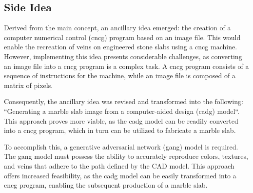 \subsection{Side Idea}
Derived from the main concept, an ancillary idea emerged: the creation of a computer numerical control (\gls{cncg}\glsfirstoccur) program based on an image file. 
This would enable the recreation of veins on engineered stone slabs using a \gls{cncg} machine. 
However, implementing this idea presents considerable challenges, as converting an image file into a \gls{cncg} program is a complex task. 
A \gls{cncg} program consists of a sequence of instructions for the machine, while an image file is composed of a matrix of pixels.

Consequently, the ancillary idea was revised and transformed into the following: ``Generating a marble slab image from a computer-aided design (\gls{cadg}\glsfirstoccur) model``.
This approach proves more viable, as the \gls{cadg} model can be readily converted into a \gls{cncg} program, which in turn can be utilized to fabricate a marble slab.

To accomplish this, a generative adversarial network (\gls{gang}\glsfirstoccur) model is required. 
The \gls{gang} model must possess the ability to accurately reproduce colors, textures, and veins that adhere to the path defined by the CAD model. 
This approach offers increased feasibility, as the \gls{cadg} model can be easily transformed into a \gls{cncg} program, enabling the subsequent production of a marble slab.

